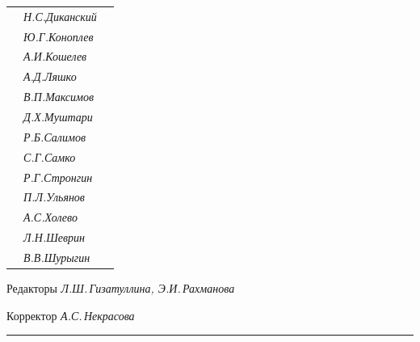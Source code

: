 \begin{tabular}{p{63mm}p{40mm}p{50mm}}
                               &   \it Н.С.\;Диканский & \\


                               &   \it Ю.Г.\;Коноплев & \\


                               &   \it А.И.\;Кошелев  & \\


                               &   \it А.Д.\;Ляшко  & \\


                               &   \it В.П.\;Максимов  & \\


                               &   \it Д.Х.\;Муштари & \\


                               &   \it Р.Б.\;Салимов  & \\


                               &   \it С.Г.\;Самко  & \\


                               &   \it Р.Г.\;Стронгин  & \\


                               &   \it П.Л.\;Ульянов  & \\


                               &   \it А.С.\;Холево  & \\


                               &   \it Л.Н.\;Шеврин  & \\


                               &   \it В.В.\;Шурыгин  & \\


\end{tabular} 


\bigskip 


\bigskip 


\bigskip 





 


\centerline{Редакторы \it Л.Ш.\,Гизатуллина, Э.И.\,Рахманова}


\centerline{Корректор \it А.С.\,Некрасова}


\bigskip 


\hrule 


\setlength{\hoffset}{-23mm}


\bigskip


